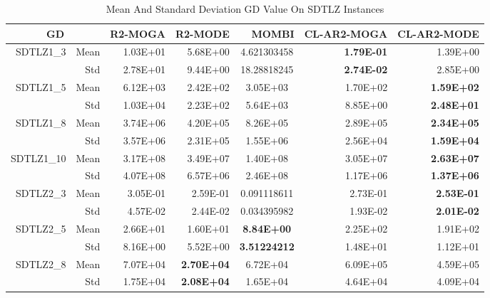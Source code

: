 \begin{table*}[htbp]
  \centering
  \caption{Mean And Standard Deviation GD Value On SDTLZ Instances}
    \begin{tabular}{rrrrrrr}
    \toprule
    \multicolumn{2}{c}{GD} & R2-MOGA & R2-MODE & MOMBI & CL-AR2-MOGA & CL-AR2-MODE \\
    \midrule
    \multirow{2}[0]{*}{SDTLZ1\_3} & Mean  & 1.03E+01 & 5.68E+00 & \multicolumn{1}{c}{4.621303458} & \textbf{1.79E-01} & 1.39E+00 \\
          & Std   & 2.78E+01 & 9.44E+00 & \multicolumn{1}{c}{18.28818245} & \textbf{2.74E-02} & 2.85E+00 \\
    \multirow{2}[0]{*}{SDTLZ1\_5} & Mean  & 6.12E+03 & 2.42E+02 & \multicolumn{1}{c}{3.05E+03} & 1.70E+02 & \textbf{1.59E+02} \\
          & Std   & 1.03E+04 & 2.23E+02 & \multicolumn{1}{c}{5.64E+03} & 8.85E+00 & \textbf{2.48E+01} \\
    \multirow{2}[0]{*}{SDTLZ1\_8} & Mean  & 3.74E+06 & 4.20E+05 & \multicolumn{1}{c}{8.26E+05} & 2.89E+05 & \textbf{2.34E+05} \\
          & Std   & 3.57E+06 & 2.31E+05 & \multicolumn{1}{c}{1.55E+06} & 2.56E+04 & \textbf{1.59E+04} \\
    \multirow{2}[0]{*}{SDTLZ1\_10} & Mean  & 3.17E+08 & 3.49E+07 & \multicolumn{1}{c}{1.40E+08} & 3.05E+07 & \textbf{2.63E+07} \\
          & Std   & 4.07E+08 & 6.57E+06 & \multicolumn{1}{c}{2.46E+08} & 1.17E+06 & \textbf{1.37E+06} \\
    \multirow{2}[0]{*}{SDTLZ2\_3} & Mean  & 3.05E-01 & 2.59E-01 & \multicolumn{1}{c}{0.091118611} & 2.73E-01 & \textbf{2.53E-01} \\
          & Std   & 4.57E-02 & 2.44E-02 & \multicolumn{1}{c}{0.034395982} & 1.93E-02 & \textbf{2.01E-02} \\
    \multirow{2}[0]{*}{SDTLZ2\_5} & Mean  & 2.66E+01 & 1.60E+01 & \multicolumn{1}{c}{\textbf{8.84E+00}} & 2.25E+02 & 1.91E+02 \\
          & Std   & 8.16E+00 & 5.52E+00 & \multicolumn{1}{c}{\textbf{3.51224212}} & 1.48E+01 & 1.12E+01 \\
    \multirow{2}[0]{*}{SDTLZ2\_8} & Mean  & 7.07E+04 & \textbf{2.70E+04} & \multicolumn{1}{c}{6.72E+04} & 6.09E+05 & 4.59E+05 \\
          & Std   & 1.75E+04 & \textbf{2.08E+04} & \multicolumn{1}{c}{1.65E+04} & 4.64E+04 & 4.09E+04 \\

\end{tabular}
\end{table*}
